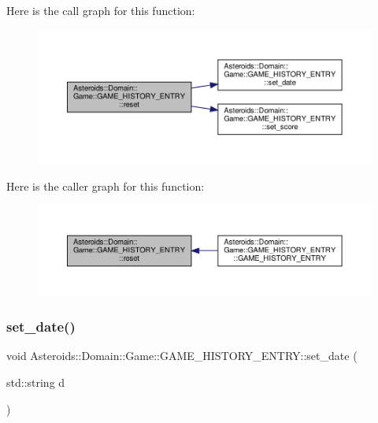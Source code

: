 Here is the call graph for this function\+:\nopagebreak
\begin{figure}[H]
\begin{center}
\leavevmode
\includegraphics[width=350pt]{classAsteroids_1_1Domain_1_1Game_1_1GAME__HISTORY__ENTRY_a022471c5c4f1a5d7a3f18f0f6866c9a8_cgraph}
\end{center}
\end{figure}
Here is the caller graph for this function\+:\nopagebreak
\begin{figure}[H]
\begin{center}
\leavevmode
\includegraphics[width=350pt]{classAsteroids_1_1Domain_1_1Game_1_1GAME__HISTORY__ENTRY_a022471c5c4f1a5d7a3f18f0f6866c9a8_icgraph}
\end{center}
\end{figure}
\mbox{\label{classAsteroids_1_1Domain_1_1Game_1_1GAME__HISTORY__ENTRY_adb0e9c9f31373615343821a552366b37}} 
\subsubsection{\texorpdfstring{set\+\_\+date()}{set\_date()}}
{\footnotesize\ttfamily void Asteroids\+::\+Domain\+::\+Game\+::\+G\+A\+M\+E\+\_\+\+H\+I\+S\+T\+O\+R\+Y\+\_\+\+E\+N\+T\+R\+Y\+::set\+\_\+date (\begin{DoxyParamCaption}\item[{std\+::string}]{d }\end{DoxyParamCaption})\hspace{0.3cm}{\ttfamily [virtual]}}



